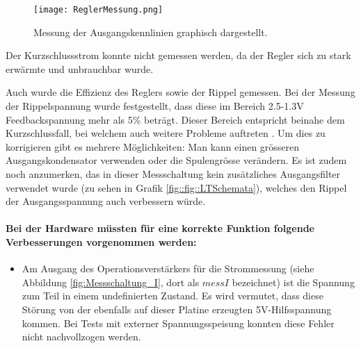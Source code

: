 \begin{figure}[h]
\texttt{[image: ReglerMessung.png]}%
\caption{Messung der Ausgangskennlinien graphisch dargestellt.}
\label{fig::Reglermessung}
\end{figure}

Der Kurzschlussstrom konnte nicht gemessen werden, da der Regler sich zu stark erwärmte und unbrauchbar wurde.

Auch wurde die Effizienz des Reglers sowie der Rippel gemessen.
Bei der Messung der Rippelspannung wurde festgestellt, dass diese im Bereich 2.5-1.3V Feedbackspannung mehr als 5\% beträgt. Dieser Bereich entspricht beinahe dem Kurzschlussfall, bei welchem auch weitere Probleme auftreten . Um dies zu korrigieren gibt es mehrere Möglichkeiten: Man kann einen grösseren Ausgangskondensator verwenden oder die Spulengrösse verändern. Es ist zudem noch anzumerken, das in dieser Messschaltung kein zusätzliches Ausgangsfilter verwendet wurde (zu sehen in Grafik \ref{fig::fig::LTSchemata}), welches den Rippel der Ausgangsspannung auch verbessern würde. 

\paragraph{Bei der Hardware müssten für eine korrekte Funktion folgende Verbesserungen vorgenommen werden:}
\begin{itemize}
	\item Am Ausgang des Operationsverstärkers für die Strommessung (siehe Abbildung \ref{fig:Messschaltung_I}, dort als $messI$ bezeichnet) ist die Spannung zum Teil in einem undefinierten Zustand. Es wird vermutet, dass diese Störung von der ebenfalls auf dieser Platine erzeugten 5V-Hilfsspannung kommen. Bei Tests mit externer Spannungsspeisung konnten diese Fehler nicht nachvollzogen werden.
\end{itemize}